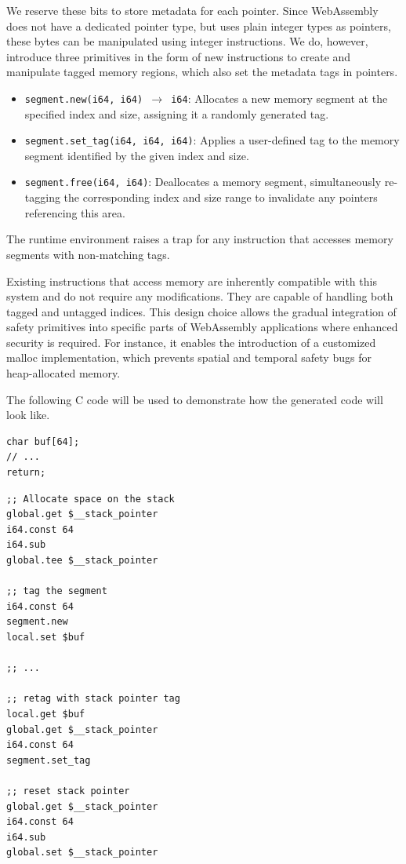 We reserve these bits to store metadata for each pointer.
Since WebAssembly does not have a dedicated pointer type, but uses plain integer types as pointers, these bytes can be manipulated using integer instructions.
We do, however, introduce three primitives in the form of new instructions to create and manipulate tagged memory regions, which also set the metadata tags in pointers.

\begin{itemize}
    \item \texttt{segment.new(i64, i64) $\rightarrow$ i64}: Allocates a new memory segment at the specified index and size, assigning it a randomly generated tag.
    \item \texttt{segment.set\_tag(i64, i64, i64)}: Applies a user-defined tag to the memory segment identified by the given index and size.
    \item \texttt{segment.free(i64, i64)}: Deallocates a memory segment, simultaneously re-tagging the corresponding index and size range to invalidate any pointers referencing this area.
\end{itemize}

The runtime environment raises a trap for any instruction that accesses memory segments with non-matching tags.

Existing instructions that access memory are inherently compatible with this system and do not require any modifications.
They are capable of handling both tagged and untagged indices.
This design choice allows the gradual integration of safety primitives into specific parts of WebAssembly applications where enhanced security is required.
For instance, it enables the introduction of a customized malloc implementation, which prevents spatial and temporal safety bugs for heap-allocated memory.


The following C code will be used to demonstrate how the generated code will look like.

\begin{lstlisting}[frame=h,style=customc,
    label={code:wasm-example-c}]
char buf[64];
// ...
return;
\end{lstlisting}

\begin{lstlisting}[frame=h,style=customwasm,
    label={lst:wasm-example}]
;; Allocate space on the stack
global.get $__stack_pointer
i64.const 64
i64.sub
global.tee $__stack_pointer

;; tag the segment
i64.const 64
segment.new
local.set $buf

;; ...

;; retag with stack pointer tag
local.get $buf
global.get $__stack_pointer
i64.const 64
segment.set_tag

;; reset stack pointer
global.get $__stack_pointer
i64.const 64
i64.sub
global.set $__stack_pointer
\end{lstlisting}

